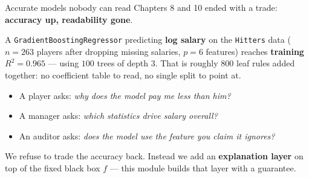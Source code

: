 \documentclass[aspectratio=169,11pt]{beamer}
\begin{document}
\begin{frame}{Accurate models nobody can read}
  Chapters 8 and 10 ended with a trade: \textbf{accuracy up, readability gone}.
  \begin{numexample}
    A \texttt{GradientBoostingRegressor} predicting \textbf{log salary} on the
    \texttt{Hitters} data ($n=263$ players after dropping missing salaries,
    $p=6$ features) reaches \textbf{training $R^2 = 0.965$} --- using
    $100$ trees of depth $3$. That is roughly $800$ leaf rules added together:
    no coefficient table to read, no single split to point at.
  \end{numexample}
  \begin{readme}
    \begin{itemize}
      \item A player asks: \emph{why does the model pay me less than him?}
      \item A manager asks: \emph{which statistics drive salary overall?}
      \item An auditor asks: \emph{does the model use the feature you claim it ignores?}
    \end{itemize}
  \end{readme}
  \begin{takeaway}
    We refuse to trade the accuracy back. Instead we add an \textbf{explanation layer}
    on top of the fixed black box $f$ --- this module builds that layer with a guarantee.
  \end{takeaway}
\end{frame}
\end{document}
